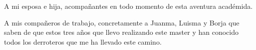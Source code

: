 A mi esposa e hija, acompañantes en todo momento de esta aventura académida.

A mis compañeros de trabajo, concretamente a Juanma, Luisma y Borja que saben de que estos tres años que llevo realizando este master y han conocido todos los derroteros que me ha llevado este camino.